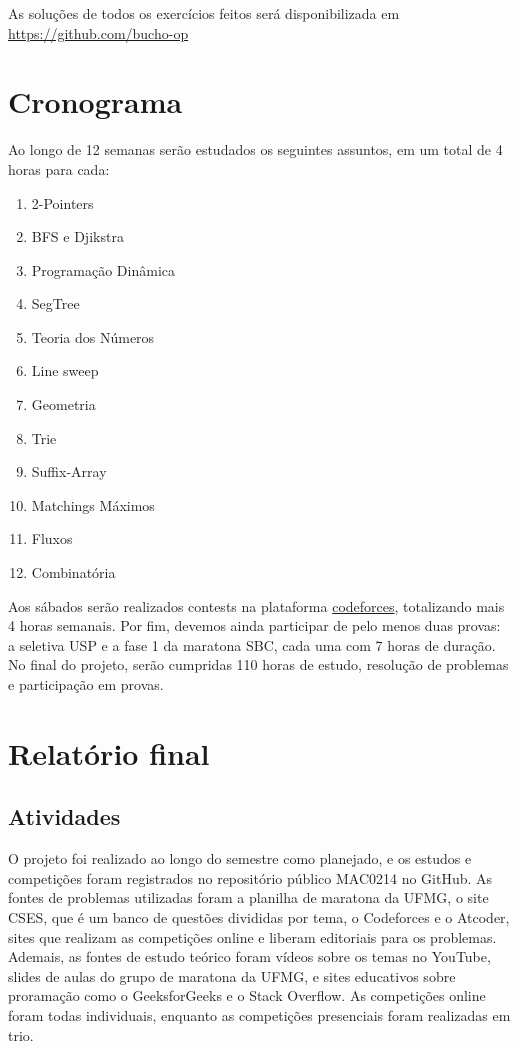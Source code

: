\documentclass{article}
\begin{document}
\hspace{5mm} As soluções de todos os exercícios feitos será disponibilizada em \href{https://github.com/bucho-op}{https://github.com/bucho-op}
\section{Cronograma}
\hspace{1cm}Ao longo de 12 semanas serão estudados os seguintes assuntos, em um total de 4 horas para cada:
\begin{enumerate}
    \item 2-Pointers
    \item BFS e Djikstra
    \item Programação Dinâmica
    \item SegTree
    \item Teoria dos Números
    \item Line sweep
    \item Geometria
    \item Trie
    \item Suffix-Array
    \item Matchings Máximos
    \item Fluxos
    \item Combinatória
\end{enumerate}

\hspace{5mm}Aos sábados serão realizados contests na plataforma \href{https://codeforces.com}{codeforces}, totalizando mais 4 horas semanais. Por fim, devemos ainda participar de pelo menos duas provas: a seletiva USP e a fase 1 da maratona SBC, cada uma com 7 horas de duração. No final do projeto, serão cumpridas 110 horas de estudo, resolução de problemas e participação em provas.

\section{Relatório final}
\subsection{Atividades}
\hspace{1cm} O projeto foi realizado ao longo do semestre como planejado, e os estudos e competições foram registrados no repositório público MAC0214 no GitHub. As fontes de problemas utilizadas foram a planilha de maratona da UFMG, o site CSES, que é um banco de questões divididas por tema, o Codeforces e o Atcoder, sites que realizam as competições online e liberam editoriais para os problemas. Ademais, as fontes de estudo teórico foram vídeos sobre os temas no YouTube, slides de aulas do grupo de maratona da UFMG, e sites educativos sobre proramação como o GeeksforGeeks e o Stack Overflow. As competições online foram todas individuais, enquanto as competições presenciais foram realizadas em trio.
\end{document}

